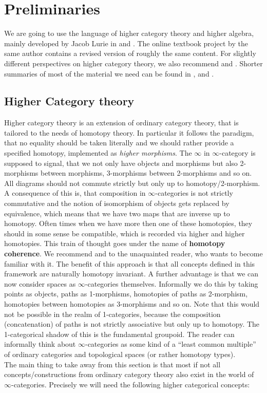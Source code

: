\chapter{Preliminaries}\label{Prelims}
We are going to use the language of higher category theory and higher algebra, mainly developed by Jacob Lurie in \cite{HigherToposTheory} and \cite{lurie2017higher}. 
The online textbook project \cite{kerodon} by the same author contains a revised version of roughly the same content. For slightly different perspectives on higher category theory, we also recommend \cite{RiehlVerityElements} and \cite{cisinski2019higher}.
Shorter summaries of most of the material we need can be found in \cite{Grothshortcourse}, \cite{camarena2013whirlwind} and \cite{Gepnerintroductionhigher}.
\section{Higher Category theory}\label{highercats}
Higher category theory is an extension of ordinary category theory, that is tailored to the needs of homotopy theory. In particular it follows the paradigm, that no equality should be taken literally and we should rather provide a specified homotopy, implemented as \textit{higher morphisms}. 
The $\infty$ in $\infty$-category is supposed to signal, that we not only have objects and morphisms but also 2-morphisms between morphisms, 3-morphisms between 2-morphisms and so on. All diagrams should not commute strictly but only up to homotopy/2-morphism. 
A consequence of this is, that composition in $\infty$-categories is not strictly commutative and the notion of isomorphism of objects gets replaced by equivalence, which means that we have two maps that are inverse up to homotopy.
Often times when we have more then one of these homotopies, they should in some sense be compatible, which is recorded via higher and higher homotopies. This train of thought goes under the name of  \textbf{homotopy coherence}.
We recommend \cite{riehl2018homotopy} and \cite[Section~1.2.6]{HigherToposTheory} to the unaquainted reader, who wants  to become familiar with it. The benefit of this approach is that all concepts defined in this framework are naturally homotopy invariant.
A further advantage is that we can now consider spaces as $\infty$-categories themselves. Informally we do this by taking points as objects, paths as 1-morphisms, homotopies of paths as 2-morphism, homotopies between homotopies as 3-morphisms and so on. Note that this would not be possible in the realm of 1-categories, because the composition (concatenation) of paths is not strictly associative but only up to homotopy. The 1-categorical shadow of this is the fundamental groupoid. The reader can informally think about $\infty$-categories as some kind of a ``least common multiple'' of ordinary categories and topological spaces (or rather homotopy types).\\
The main thing to take away from this section is that most if not all concepts/constructions from ordinary category theory also exist in the world of $\infty$-categories.
Precisely we will need the following higher categorical concepts:


